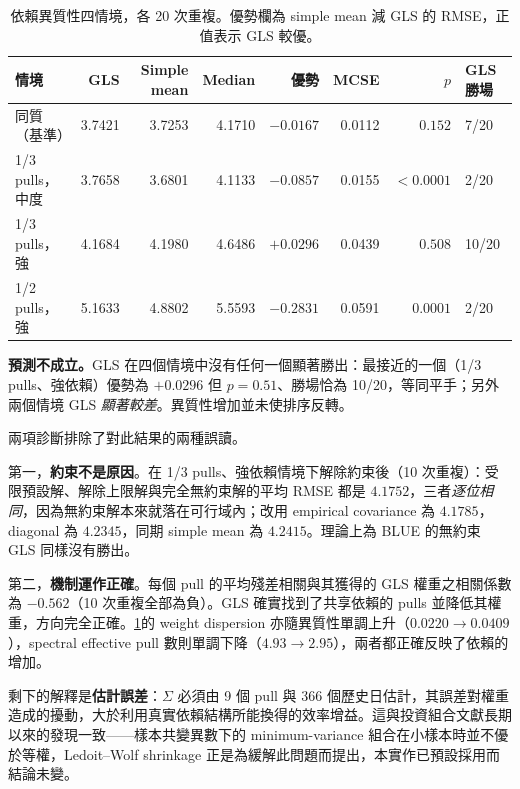 \documentclass[12pt,a4paper,oneside]{article}
\begin{document}
\begin{table}[H]
\centering
\small
\caption{依賴異質性四情境，各 20 次重複。優勢欄為 simple mean 減 GLS 的 RMSE，正值表示 GLS 較優。}
\label{tab:depexp}
\begin{tabular}{lrrrrrrl}
\toprule
情境 & GLS & Simple mean & Median & 優勢 & MCSE & $p$ & GLS 勝場\\
\midrule
同質（基準） & 3.7421 & 3.7253 & 4.1710 & $-0.0167$ & 0.0112 & $0.152$ & 7/20\\
1/3 pulls，中度 & 3.7658 & 3.6801 & 4.1133 & $-0.0857$ & 0.0155 & $<0.0001$ & 2/20\\
1/3 pulls，強 & 4.1684 & 4.1980 & 4.6486 & $+0.0296$ & 0.0439 & $0.508$ & 10/20\\
1/2 pulls，強 & 5.1633 & 4.8802 & 5.5593 & $-0.2831$ & 0.0591 & $0.0001$ & 2/20\\
\bottomrule
\end{tabular}
\end{table}

\textbf{預測不成立。}GLS 在四個情境中沒有任何一個顯著勝出：最接近的一個（1/3 pulls、強依賴）優勢為 $+0.0296$ 但 $p=0.51$、勝場恰為 10/20，等同平手；另外兩個情境 GLS \emph{顯著較差}。異質性增加並未使排序反轉。

兩項診斷排除了對此結果的兩種誤讀。

第一，\textbf{約束不是原因}。在 1/3 pulls、強依賴情境下解除約束後（10 次重複）：受限預設解、解除上限解與完全無約束解的平均 RMSE 都是 $4.1752$，三者\emph{逐位相同}，因為無約束解本來就落在可行域內；改用 empirical covariance 為 $4.1785$，diagonal 為 $4.2345$，同期 simple mean 為 $4.2415$。理論上為 BLUE 的無約束 GLS 同樣沒有勝出。

第二，\textbf{機制運作正確}。每個 pull 的平均殘差相關與其獲得的 GLS 權重之相關係數為 $-0.562$（10 次重複全部為負）。GLS 確實找到了共享依賴的 pulls 並降低其權重，方向完全正確。\cref{tab:depexp}的 weight dispersion 亦隨異質性單調上升（$0.0220\to0.0409$），spectral effective pull 數則單調下降（$4.93\to2.95$），兩者都正確反映了依賴的增加。

剩下的解釋是\textbf{估計誤差}：$\Sigma$ 必須由 9 個 pull 與 366 個歷史日估計，其誤差對權重造成的擾動，大於利用真實依賴結構所能換得的效率增益。這與投資組合文獻長期以來的發現一致——樣本共變異數下的 minimum-variance 組合在小樣本時並不優於等權，Ledoit--Wolf shrinkage \cite{ledoitwolf2004} 正是為緩解此問題而提出，本實作已預設採用而結論未變。
\end{document}
